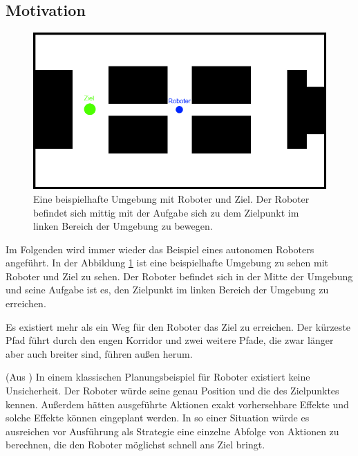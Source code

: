 \documentclass[a4paper]{IEEEtran}
\begin{document}
\subsection{Motivation}
\begin{figure}[ht]
	\centering
	\includegraphics[scale=0.42]{images/autnmRobot_basicSituation.png}
	\caption{Eine beispielhafte Umgebung mit Roboter und Ziel. Der Roboter befindet sich mittig mit der Aufgabe sich zu dem Zielpunkt im linken Bereich der Umgebung zu bewegen.}
	\label{fig:holoch_autnmRob_bSit}
\end{figure}
Im Folgenden wird immer wieder das Beispiel eines autonomen Roboters angeführt. In der Abbildung \ref{fig:holoch_autnmRob_bSit} ist eine beispielhafte Umgebung zu sehen mit Roboter und Ziel zu sehen. Der Roboter befindet sich in der Mitte der Umgebung und seine Aufgabe ist es, den Zielpunkt im linken Bereich der Umgebung zu erreichen. 

Es existiert mehr als ein Weg für den Roboter das Ziel zu erreichen. Der kürzeste Pfad führt durch den engen Korridor und zwei weitere Pfade, die zwar länger aber auch breiter sind, führen außen herum.

(Aus \cite{PR_ThrunBurgardFox}) In einem klassischen Planungsbeispiel für Roboter existiert keine Unsicherheit. Der Roboter würde seine genau Position und die des Zielpunktes kennen. Außerdem hätten ausgeführte Aktionen exakt vorhersehbare Effekte und solche Effekte können eingeplant werden. In so einer Situation würde es ausreichen vor Ausführung als Strategie eine einzelne Abfolge von Aktionen zu berechnen, die den Roboter möglichst schnell ans Ziel bringt.
\end{document}
